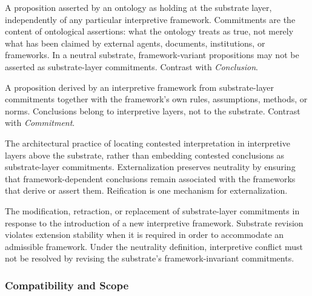 \begin{description}[style=nextline,leftmargin=1.5cm]

\item[Commitment]
A proposition asserted by an ontology as holding
at the substrate layer,
independently of any particular interpretive framework.
Commitments are the content of ontological assertions:
what the ontology treats as true,
not merely what has been claimed by external agents,
documents, institutions, or frameworks.
In a neutral substrate,
framework-variant propositions may not be asserted
as substrate-layer commitments.
Contrast with \emph{Conclusion}.

\item[Conclusion]
A proposition derived by an interpretive framework
from substrate-layer commitments together with
the framework's own rules, assumptions, methods, or norms.
Conclusions belong to interpretive layers,
not to the substrate.
Contrast with \emph{Commitment}.

\item[Externalization]
The architectural practice of locating contested interpretation
in interpretive layers above the substrate,
rather than embedding contested conclusions
as substrate-layer commitments.
Externalization preserves neutrality by ensuring that
framework-dependent conclusions remain associated
with the frameworks that derive or assert them.
Reification is one mechanism for externalization.

\item[Substrate Revision]
The modification, retraction, or replacement
of substrate-layer commitments in response to
the introduction of a new interpretive framework.
Substrate revision violates extension stability
when it is required in order to accommodate
an admissible framework.
Under the neutrality definition,
interpretive conflict must not be resolved
by revising the substrate's framework-invariant commitments.

\end{description}

\subsubsection*{Compatibility and Scope}

